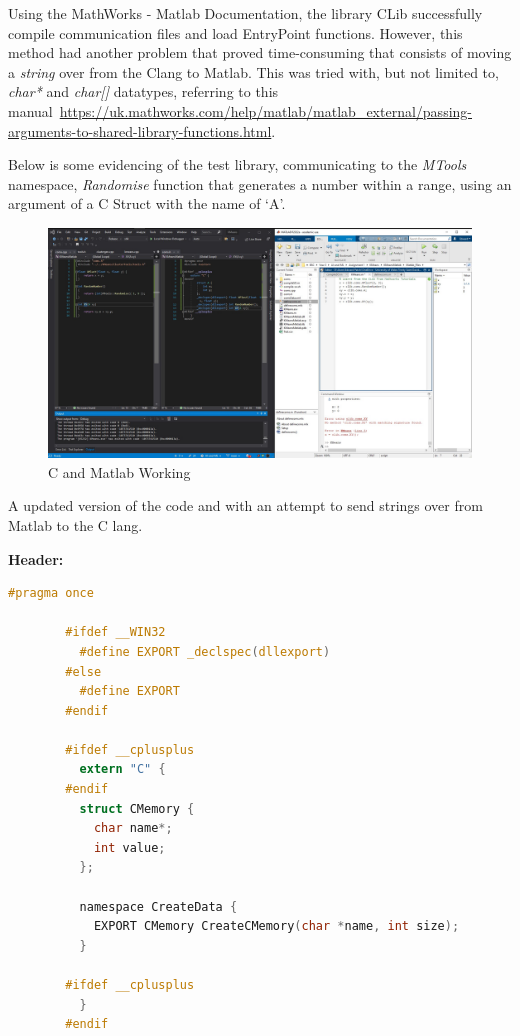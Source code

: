 \documentclass[conference]{IEEEtran}
\begin{document}
      Using the MathWorks - Matlab Documentation, the library CLib successfully compile communication files and load EntryPoint functions. However, this method had another problem that proved time-consuming that consists of moving a \textit{string} over from the Clang to Matlab. This was tried with, but not limited to, \textit{char*} and \textit{char[]} datatypes, referring to this manual~\url{https://uk.mathworks.com/help/matlab/matlab_external/passing-arguments-to-shared-library-functions.html}. 

      Below is some evidencing of the test library, communicating to the \textit{MTools} namespace, \textit{Randomise} function that generates a number within a range, using an argument of a C Struct with the name of `A'.
      
      \begin{figure}[ht]
        \centering
        \includegraphics[width=1\columnwidth]{Figures/fig1.jpg}
        \caption{C and Matlab Working}
        \label{fig:throughput}
      \end{figure}

      A updated version of the code and with an attempt to send strings over from Matlab to the C lang.

      \textbf{Header:}
      \begin{lstlisting}[language=c]
        #pragma once

        #ifdef __WIN32
          #define EXPORT _declspec(dllexport)
        #else
          #define EXPORT
        #endif

        #ifdef __cplusplus
          extern "C" {
        #endif
          struct CMemory {
            char name*;
            int value;
          };

          namespace CreateData {
            EXPORT CMemory CreateCMemory(char *name, int size);
          }

        #ifdef __cplusplus
          }
        #endif
      \end{lstlisting}
\end{document}
